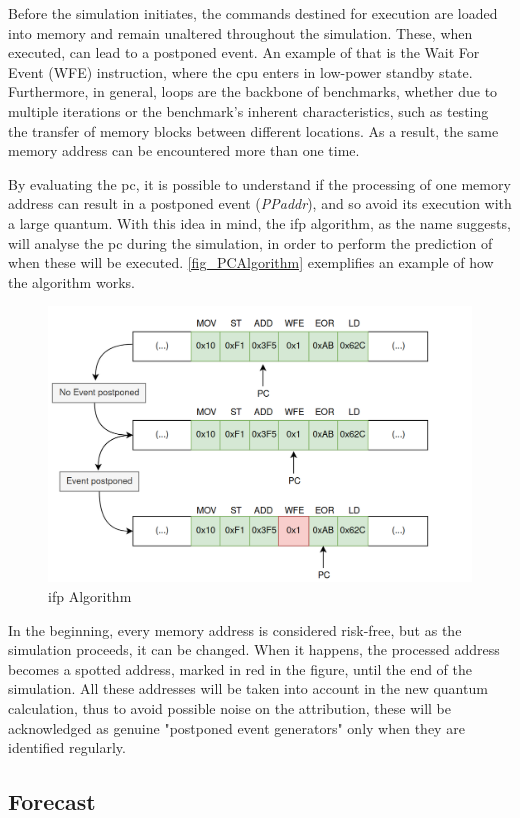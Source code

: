Before the simulation initiates, the commands destined for execution are loaded into memory and remain unaltered throughout the simulation. These, 
when executed, can lead to a postponed event. An example of that is the Wait For Event (WFE) instruction, where the \gls{cpu} enters in low-power 
standby state. Furthermore, in general, loops are the backbone of benchmarks, whether due to multiple iterations or the benchmark's inherent 
characteristics, such as testing the transfer of memory blocks between different locations. As a result, the same memory address can be 
encountered more than one time. 

By evaluating the \gls{pc}, it is possible to understand if the processing of one memory address can result in a postponed event (\textit{PPaddr}), 
and so avoid its execution with a large quantum. With this idea in mind, the \gls{ifp} algorithm, as the name suggests, will analyse the \gls{pc} during 
the simulation, in order to perform the prediction of when these will be executed. \autoref{fig_PCAlgorithm} exemplifies an example 
of how the algorithm works.

\begin{figure}[h!]
	\centering
 	\includegraphics[width=0.7\linewidth]{Images/PCAlgorithm.png}
 	\caption{\gls{ifp} Algorithm}
	 \label{fig_PCAlgorithm}
\end{figure}

In the beginning, every memory address is considered risk-free, but as the simulation proceeds, it can be changed. When it happens, the processed 
address becomes a spotted address, marked in red in the figure, until the end of the simulation. All these addresses will be taken into 
account in the new quantum calculation, thus to avoid possible noise on the attribution, these will be acknowledged as genuine 
"postponed event generators" only when they are identified regularly.

 
\subsection{Forecast}

